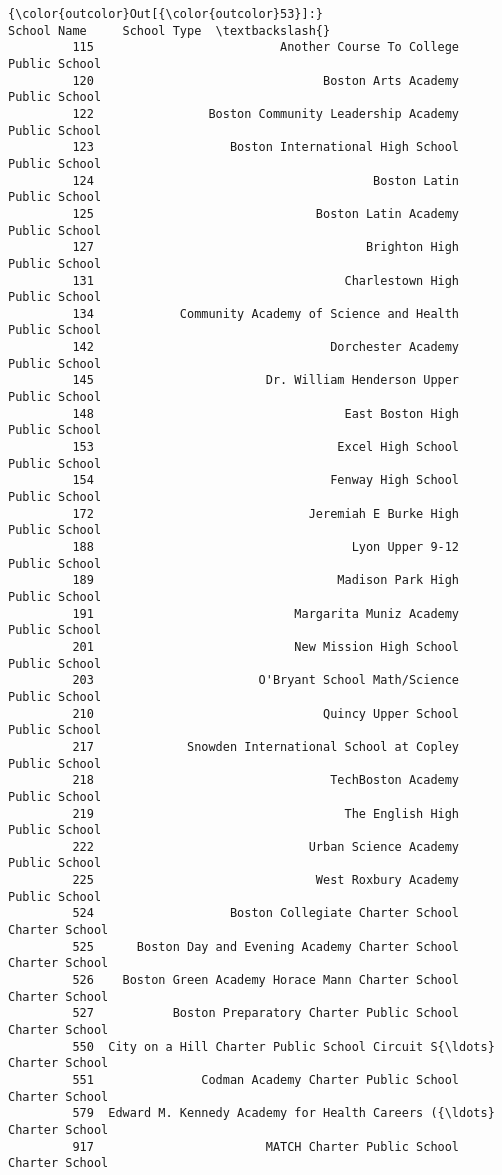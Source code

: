 \documentclass[11pt]{article}
\begin{document}
\begin{Verbatim}[commandchars=\\\{\}]
{\color{outcolor}Out[{\color{outcolor}53}]:}                                            School Name     School Type  \textbackslash{}
         115                          Another Course To College   Public School   
         120                                Boston Arts Academy   Public School   
         122                Boston Community Leadership Academy   Public School   
         123                   Boston International High School   Public School   
         124                                       Boston Latin   Public School   
         125                               Boston Latin Academy   Public School   
         127                                      Brighton High   Public School   
         131                                   Charlestown High   Public School   
         134            Community Academy of Science and Health   Public School   
         142                                 Dorchester Academy   Public School   
         145                        Dr. William Henderson Upper   Public School   
         148                                   East Boston High   Public School   
         153                                  Excel High School   Public School   
         154                                 Fenway High School   Public School   
         172                              Jeremiah E Burke High   Public School   
         188                                    Lyon Upper 9-12   Public School   
         189                                  Madison Park High   Public School   
         191                            Margarita Muniz Academy   Public School   
         201                            New Mission High School   Public School   
         203                       O'Bryant School Math/Science   Public School   
         210                                Quincy Upper School   Public School   
         217             Snowden International School at Copley   Public School   
         218                                 TechBoston Academy   Public School   
         219                                   The English High   Public School   
         222                              Urban Science Academy   Public School   
         225                               West Roxbury Academy   Public School   
         524                   Boston Collegiate Charter School  Charter School   
         525      Boston Day and Evening Academy Charter School  Charter School   
         526    Boston Green Academy Horace Mann Charter School  Charter School   
         527           Boston Preparatory Charter Public School  Charter School   
         550  City on a Hill Charter Public School Circuit S{\ldots}  Charter School   
         551               Codman Academy Charter Public School  Charter School   
         579  Edward M. Kennedy Academy for Health Careers ({\ldots}  Charter School   
         917                        MATCH Charter Public School  Charter School   
         

\end{Verbatim}
\end{document}
